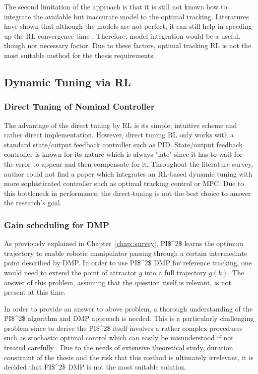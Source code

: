 The second limitation of the approach is that it is still not known how to integrate the available but inaccurate model to the optimal tracking. Literatures have shown that although the models are not perfect, it can still help in speeding up the \acs {RL} convergence time \cite{Brujeni5669655} \cite{Grondman6096441}. Therefore, model integration would be a useful, though not necessary factor. Due to these factors, optimal tracking \acs {RL} is not the most suitable method for the thesis requirements.

\subsection{Dynamic Tuning via \acs{RL}}
\subsubsection{Direct Tuning of Nominal Controller}
The advantage of the direct tuning by \acs{RL} is its simple, intuitive scheme and rather direct implementation. However, direct tuning \acs{RL} only works with a standard state/output feedback controller such as \acs{PID}. State/output feedback controller is known for its nature which is always "late" since it has to wait for the error to appear and then compensate for it. Throughout the literature survey, author could not find a paper which integrates an \acs{RL}-based dynamic tuning with more sophisticated controller such as optimal tracking control or \acs {MPC}. Due to this bottleneck in performance, the direct-tuning is not the best choice to answer the research's goal.
\subsubsection{Gain scheduling for \acs{DMP}}
As previously explained in Chapter~\ref{chap::survey}, \acs{PI$^2$} learns the optimum trajectory to enable robotic manipulator passing through a certain intermediate point described by \acs{DMP}. In order to use \acs{PI$^2$} \acs{DMP} for reference tracking, one would need to extend the point of attractor $g$ into a full trajectory $g(k)$. The answer of this problem, assuming that the question itself is relevant, is not present at this time.

In order to provide an answer to above problem, a thorough understanding of the \acs{PI$^2$} algorithm and \acs {DMP} approach is needed. This is a particularly challenging problem since to derive the \acs{PI$^2$} itself involves a rather complex procedures such as stochastic optimal control which can easily be misunderstood if not treated carefully \cite{Buchli2010}. Due to the needs of extensive theoretical study, duration constraint of the thesis and the risk that this method is ultimately irrelevant, it is decided that \acs {PI$^2$} \acs{DMP} is not the most suitable solution.

